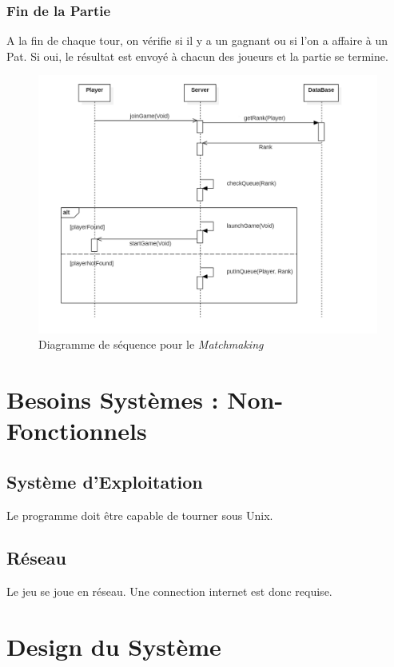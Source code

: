 \documentclass[10pt, a4paper]{article}
\begin{document}
\subsubsection{Fin de la Partie}
A la fin de chaque tour, on vérifie si il y a un gagnant ou si l'on a affaire à un Pat. Si oui, le résultat est envoyé à chacun des joueurs et la partie se termine.

		
\begin{figure}[ht]
\centering
\includegraphics[scale=0.4]{SequenceDiagramMatchmaking.PNG}
\caption{Diagramme de séquence pour le \textit{Matchmaking}}
\label{SD_matchmaker} %
\end{figure}

\section{Besoins Systèmes : Non-Fonctionnels}


\subsection{Système d'Exploitation}
Le programme doit être capable de tourner sous Unix. \\

\subsection{Réseau}
Le jeu se joue en réseau. Une connection internet est donc requise. \\

\section{Design du Système}
\end{document}
